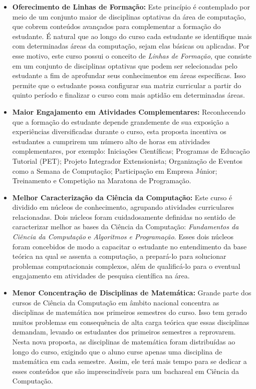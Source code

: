 \begin{itemize}

\item \textbf{Oferecimento de Linhas de  Formação:} Este princípio é contemplado por meio de um conjunto maior de disciplinas optativas da área de computação, que cobrem conteúdos avançados para complementar a formação do estudante. É natural que ao longo do curso cada estudante se identifique mais com determinadas áreas da computação, sejam elas básicas ou aplicadas. Por esse motivo, este curso possui o conceito de \textit{Linhas de Formação}, que consiste em um conjunto de disciplinas optativas que podem ser selecionadas pelo estudante a fim de aprofundar seus conhecimentos em áreas específicas. Isso permite que o estudante possa configurar sua matriz curricular a partir do quinto período e finalizar o curso com mais aptidão em determinadas áreas. 

\item \textbf{Maior Engajamento em Atividades Complementares:} Reconhecendo que a formação do estudante depende grandemente de sua exposição a experiências diversificadas durante o curso, esta proposta incentiva os estudantes a cumprirem um número alto de horas em atividades complementares, por exemplo: Iniciações Científicas; Programas de Educação Tutorial (PET); Projeto Integrador Extensionista; Organização de Eventos como a Semana de Computação; Participação em Empresa Júnior; Treinamento e Competição na Maratona de Programação.

\item \textbf{Melhor Caracterização da Ciência da Computação:} Este curso é dividido em núcleos de conhecimento, agrupando atividades curriculares relacionadas. Dois núcleos foram cuidadosamente definidas no sentido de caracterizar melhor as bases da Ciência da Computação: \textit{Fundamentos da Ciência da Computação} e \textit{Algoritmos e Programação}. Esses dois núcleos foram concebidos de modo a capacitar o estudante no entendimento da base teórica na qual se assenta a computação, a prepará-lo para solucionar problemas computacionais complexos, além de qualificá-lo para o eventual engajamento em atividades de pesquisa científica na área.


\item \textbf{Menor Concentração de Disciplinas de Matemática:} Grande parte dos cursos de Ciência da Computação em âmbito nacional concentra as disciplinas de matemática nos primeiros semestres do curso. Isso tem gerado muitos problemas em consequência de alta carga teórica que essas disciplinas demandam, levando os estudantes dos primeiros semestres a reprovarem. Nesta nova proposta, as disciplinas de matemática foram distribuídas ao longo do curso, exigindo que o aluno curse apenas uma disciplina de matemática em cada semestre. Assim, ele terá mais tempo para se dedicar a esses conteúdos que são imprescindíveis para um bachareal em Ciência da Computação.



\end{itemize}
